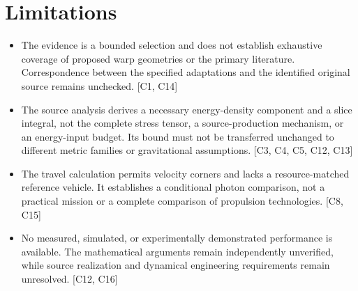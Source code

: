 \documentclass[11pt]{article}
\begin{document}
\section{Limitations}
\begin{itemize}
\item The evidence is a bounded selection and does not establish exhaustive coverage of proposed warp geometries or the primary literature. Correspondence between the specified adaptations and the identified original source remains unchecked. [C1, C14]
\item The source analysis derives a necessary energy-density component and a slice integral, not the complete stress tensor, a source-production mechanism, or an energy-input budget. Its bound must not be transferred unchanged to different metric families or gravitational assumptions. [C3, C4, C5, C12, C13]
\item The travel calculation permits velocity corners and lacks a resource-matched reference vehicle. It establishes a conditional photon comparison, not a practical mission or a complete comparison of propulsion technologies. [C8, C15]
\item No measured, simulated, or experimentally demonstrated performance is available. The mathematical arguments remain independently unverified, while source realization and dynamical engineering requirements remain unresolved. [C12, C16]
\end{itemize}
\end{document}
